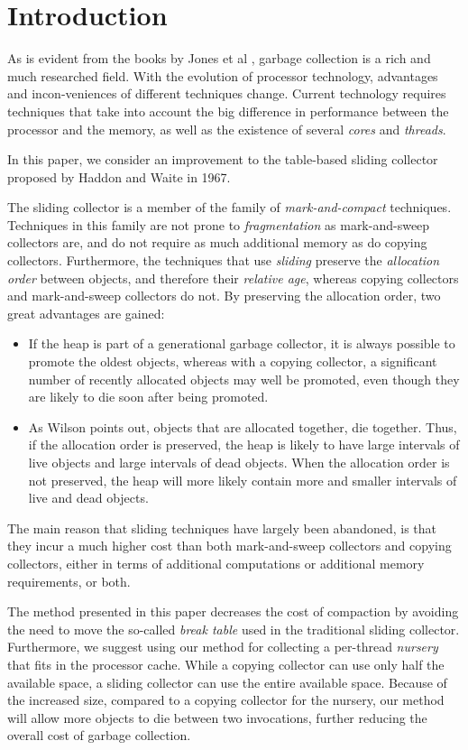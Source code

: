 \section{Introduction}

As is evident from the books by Jones et al
\cite{Jones:2011:GCH:2025255} \cite{Jones:1996:GCA:236254}, garbage
collection is a rich and much researched field.  With the evolution of
processor technology, advantages and incon-veniences of different
techniques change.  Current technology requires techniques that take
into account the big difference in performance between the processor
and the memory, as well as the existence of several \emph{cores} and
\emph{threads}.

In this paper, we consider an improvement to the table-based sliding
collector proposed by Haddon and Waite \cite{Haddon:1967} in 1967.

The sliding collector is a member of the family of
\emph{mark-and-compact} techniques.  Techniques in this family are not
prone to \emph{fragmentation} as mark-and-sweep collectors are, and do
not require as much additional memory as do copying collectors.
Furthermore, the techniques that use \emph{sliding} preserve the
\emph{allocation order} between objects, and therefore their
\emph{relative age}, whereas copying collectors and mark-and-sweep
collectors do not.  By preserving the allocation order, two great
advantages are gained:

\begin{itemize}
\item If the heap is part of a generational garbage collector, it is
  always possible to promote the oldest objects, whereas with a
  copying collector, a significant number of recently allocated 
  objects may well be promoted, even though they are likely to die
  soon after being promoted. 
\item As Wilson \cite{Wilson:1992:UGC:645648.664824} points out,
  objects that are allocated together, die together.  Thus, if the
  allocation order is preserved, the heap is likely to have
  large intervals of live objects and large intervals of dead
  objects.  When the allocation order is not preserved, the heap will
  more likely contain more and smaller intervals of live and dead
  objects. 
\end{itemize}

The main reason that sliding techniques have largely been abandoned,
is that they incur a much higher cost than both mark-and-sweep
collectors and copying collectors, either in terms of additional
computations or additional memory requirements, or both. 

The method presented in this paper decreases the cost of compaction by
avoiding the need to move the so-called \emph{break table} used in the
traditional sliding collector.  Furthermore, we suggest using our
method for collecting a per-thread \emph{nursery} that fits in the
processor cache.  While a copying collector can use only half the
available space, a sliding collector can use the entire available
space.  Because of the increased size, compared to a copying collector
for the nursery, our method will allow more objects to die
between two invocations, further reducing the overall cost of
garbage collection.
